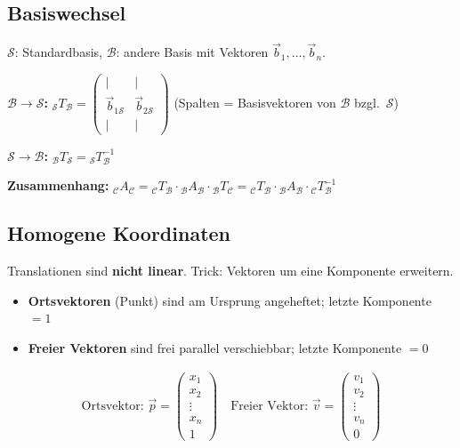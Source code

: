 \subsection{Basiswechsel}
$\mathcal{S}$: Standardbasis, $\mathcal{B}$: andere Basis mit Vektoren $\vec{b}_1, \ldots, \vec{b}_n$.

\textbf{$\mathcal{B} \to \mathcal{S}$:} ${}_\mathcal{S}T_\mathcal{B} = \begin{pmatrix} | & | \\ \vec{b}_{1\mathcal{S}} & \vec{b}_{2\mathcal{S}} \\ | & | \end{pmatrix}$ (Spalten = Basisvektoren von $\mathcal{B}$ bzgl.\ $\mathcal{S}$)

\textbf{$\mathcal{S} \to \mathcal{B}$:} ${}_\mathcal{B}T_\mathcal{S} = {}_\mathcal{S}T_\mathcal{B}^{-1}$

\textbf{Zusammenhang:} ${}_\mathcal{C}A_\mathcal{C} = {}_\mathcal{C}T_\mathcal{B} \cdot {}_\mathcal{B}A_\mathcal{B} \cdot {}_\mathcal{B}T_\mathcal{C} = {}_\mathcal{C}T_\mathcal{B} \cdot {}_\mathcal{B}A_\mathcal{B} \cdot {}_\mathcal{C}T_\mathcal{B}^{-1}$

\subsection{Homogene Koordinaten}
Translationen sind \textbf{nicht linear}. Trick: Vektoren um eine Komponente erweitern.
\begin{itemize}
    \item \textbf{Ortsvektoren} (Punkt) sind am Ursprung angeheftet; letzte Komponente $= 1$ 
    \item \textbf{Freier Vektoren} sind frei parallel verschiebbar; letzte Komponente $= 0$
\end{itemize}
\begin{align*}
    \text{Ortsvektor: } \vec{p} = \begin{pmatrix} x_1 \\ x_2 \\ \vdots \\ x_n \\ 1 \end{pmatrix} \quad
    \text{Freier Vektor: } \vec{v} = \begin{pmatrix} v_1 \\ v_2 \\ \vdots \\ v_n \\ 0 \end{pmatrix}
\end{align*}

